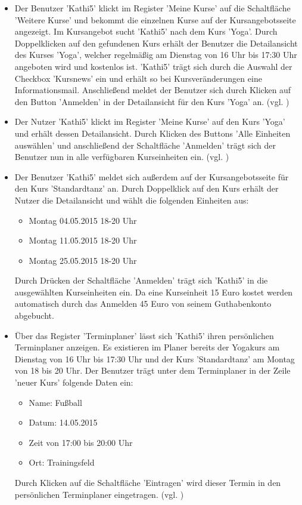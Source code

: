 \documentclass[a4paper]{scrreprt}
\begin{document}
			\begin{itemize}
				\item {} 
				Der Benutzer 'Kathi5' klickt im Register 'Meine Kurse' auf die Schaltfläche 'Weitere Kurse' und bekommt die einzelnen Kurse auf der Kursangebotsseite angezeigt. Im Kursangebot sucht 'Kathi5' nach dem Kurs 'Yoga'. Durch Doppelklicken auf den gefundenen Kurs erhält der Benutzer die Detailansicht des Kurses 'Yoga', welcher regelmäßig am Dienstag von 16 Uhr bis 17:30 Uhr angeboten wird und kostenlos ist. 'Kathi5' trägt sich durch die Auswahl der Checkbox 'Kursnews' ein und erhält so bei Kursveränderungen eine Informationsmail. Anschließend meldet der Benutzer sich durch Klicken auf den Button 'Anmelden' in der Detailansicht für den Kurs 'Yoga' an. (vgl. )
				
				\item {} 
				Der Nutzer 'Kathi5'	klickt im Register 'Meine Kurse' auf den Kurs 'Yoga' und erhält dessen Detailansicht. Durch Klicken des Buttons 'Alle Einheiten auswählen' und anschließend der Schaltfläche 'Anmelden' trägt sich der Benutzer nun in alle verfügbaren Kurseinheiten ein. (vgl. )
				
				\item {}
				Der Benutzer 'Kathi5' meldet sich außerdem auf der Kursangebotsseite für den Kurs 'Standardtanz' an. Durch Doppelklick auf den Kurs erhält der Nutzer die Detailansicht und wählt die folgenden Einheiten aus:
					\begin{itemize}
						\item Montag 04.05.2015 18-20 Uhr
						\item Montag 11.05.2015 18-20 Uhr
						\item Montag 25.05.2015 18-20 Uhr		
					\end{itemize}	
				Durch Drücken der Schaltfläche 'Anmelden' trägt sich 'Kathi5' in die ausgewählten Kurseinheiten ein. Da eine Kurseinheit 15 Euro kostet werden automatisch durch das Anmelden 45 Euro von seinem Guthabenkonto abgebucht.
				
				\item {}
				Über das Register 'Terminplaner' lässt sich 'Kathi5' ihren persönlichen Terminplaner anzeigen. Es existieren im Planer bereits der Yogakurs am Dienstag von 16 Uhr bis 17:30 Uhr und der Kurs 'Standardtanz' am Montag von 18 bis 20 Uhr. Der Benutzer trägt unter dem Terminplaner in der Zeile 'neuer Kurs' folgende Daten ein:
					\begin{itemize}
						\item Name: Fußball
						\item Datum: 14.05.2015
						\item Zeit von 17:00 bis 20:00 Uhr
						\item Ort: Trainingsfeld		
					\end{itemize}
				Durch Klicken auf die Schaltfläche 'Eintragen' wird dieser Termin in den persönlichen Terminplaner eingetragen. (vgl. )
				

\end{itemize}
\end{document}
